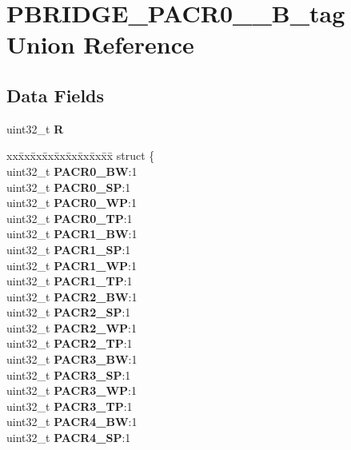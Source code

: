 \hypertarget{unionPBRIDGE__PACR0__7__32B__tag}{}\section{P\+B\+R\+I\+D\+G\+E\+\_\+\+P\+A\+C\+R0\+\_\+\_\+B\+\_\+tag Union Reference}
\label{unionPBRIDGE__PACR0__7__32B__tag}
\subsection*{Data Fields}
\begin{DoxyCompactItemize}
\item 
\mbox{\label{unionPBRIDGE__PACR0__7__32B__tag_acc4382d1bed5ff6720d2a88b6a4ea7c6}} 
uint32\+\_\+t {\bfseries R}
\item 
\mbox{\label{unionPBRIDGE__PACR0__7__32B__tag_afa36218702ce8234a336759c224c0996}} 
\begin{tabbing}
xx\=xx\=xx\=xx\=xx\=xx\=xx\=xx\=xx\=\kill
struct \{\\
\>uint32\_t {\bfseries PACR0\_BW}:1\\
\>uint32\_t {\bfseries PACR0\_SP}:1\\
\>uint32\_t {\bfseries PACR0\_WP}:1\\
\>uint32\_t {\bfseries PACR0\_TP}:1\\
\>uint32\_t {\bfseries PACR1\_BW}:1\\
\>uint32\_t {\bfseries PACR1\_SP}:1\\
\>uint32\_t {\bfseries PACR1\_WP}:1\\
\>uint32\_t {\bfseries PACR1\_TP}:1\\
\>uint32\_t {\bfseries PACR2\_BW}:1\\
\>uint32\_t {\bfseries PACR2\_SP}:1\\
\>uint32\_t {\bfseries PACR2\_WP}:1\\
\>uint32\_t {\bfseries PACR2\_TP}:1\\
\>uint32\_t {\bfseries PACR3\_BW}:1\\
\>uint32\_t {\bfseries PACR3\_SP}:1\\
\>uint32\_t {\bfseries PACR3\_WP}:1\\
\>uint32\_t {\bfseries PACR3\_TP}:1\\
\>uint32\_t {\bfseries PACR4\_BW}:1\\
\>uint32\_t {\bfseries PACR4\_SP}:1\\

\end{tabbing}
\end{DoxyCompactItemize}
